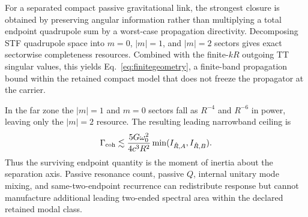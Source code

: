 For a separated compact passive gravitational link, the strongest closure is obtained by preserving angular information rather than multiplying a total endpoint quadrupole sum by a worst-case propagation directivity. Decomposing STF quadrupole space into $m=0$, $|m|=1$, and $|m|=2$ sectors gives exact sectorwise completeness resources. Combined with the finite-$kR$ outgoing TT singular values, this yields Eq.~\eqref{eq:finitegeometry}, a finite-band propagation bound within the retained compact model that does not freeze the propagator at the carrier.

In the far zone the $|m|=1$ and $m=0$ sectors fall as $R^{-4}$ and $R^{-6}$ in power, leaving only the $|m|=2$ resource. The resulting leading narrowband ceiling is
\begin{equation}
\Gamma_{\rm coh}
\lesssim
\frac{5G\omega_0^2}{4c^3R^2}
\min(I_{\hat R,A},I_{\hat R,B}).
\end{equation}
Thus the surviving endpoint quantity is the moment of inertia about the separation axis. Passive resonance count, passive $Q$, internal unitary mode mixing, and same-two-endpoint recurrence can redistribute response but cannot manufacture additional leading two-ended spectral area within the declared retained modal class.